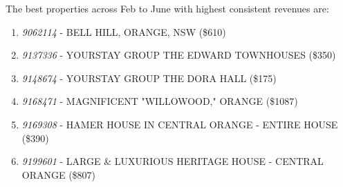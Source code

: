 \documentclass[11pt]{article}
\providecommand{\tightlist}{%
      \setlength{\itemsep}{0pt}\setlength{\parskip}{0pt}}
\begin{document}
    The best properties across Feb to June with highest consistent revenues
are:

\begin{enumerate}
\def\labelenumi{\arabic{enumi}.}
\tightlist
\item
  \emph{9062114} - BELL HILL, ORANGE, NSW (\$610)
\item
  \emph{9137336} - YOURSTAY GROUP THE EDWARD TOWNHOUSES (\$350)
\item
  \emph{9148674} - YOURSTAY GROUP THE DORA HALL (\$175)
\item
  \emph{9168471} - MAGNIFICENT "WILLOWOOD," ORANGE (\$1087)
\item
  \emph{9169308} - HAMER HOUSE IN CENTRAL ORANGE - ENTIRE HOUSE (\$390)
\item
  \emph{9199601} - LARGE \& LUXURIOUS HERITAGE HOUSE - CENTRAL ORANGE
  (\$807)
\end{enumerate}
\end{document}
